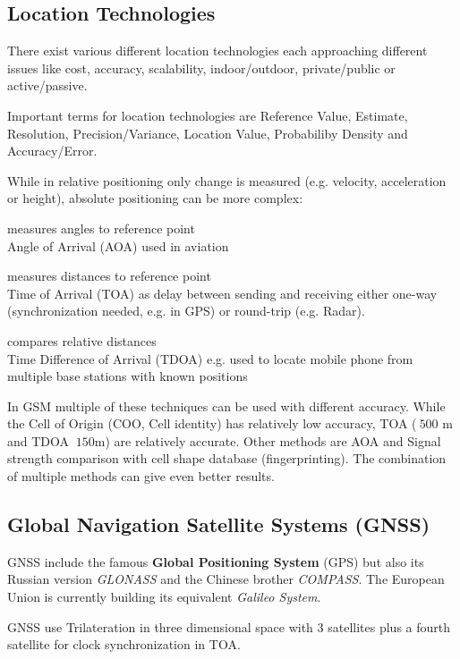 \documentclass{article}
\newlength{\wideitemsep}
\let\olditem\item
\renewcommand{\item}{\setlength{\itemsep}{\wideitemsep}\olditem}
\begin{document}
\begin{multicols}{2}
\subsection{Location Technologies}
There exist various different location technologies each approaching different
issues like cost, accuracy, scalability, indoor/outdoor, private/public or
active/passive.

Important terms for location technologies are Reference Value, Estimate,
Resolution, Precision/Variance, Location Value, Probabiliby Density and
Accuracy/Error.

While in relative positioning only change is measured (e.g. velocity,
acceleration or height), absolute positioning can be more complex:
\begin{description}
\item[Triangulation] measures angles to reference point \ \\
    Angle of Arrival (AOA) used in aviation
\item[Trilateration] measures distances to reference point \ \\
    Time of Arrival (TOA) as delay between sending and receiving either one-way
    (synchronization needed, e.g. in GPS) or round-trip (e.g. Radar).
\item[Multilateration] compares relative distances \ \\
    Time Difference of Arrival (TDOA) e.g. used to locate mobile phone from
    multiple base stations with known positions
\end{description}

In GSM multiple of these techniques can be used with different accuracy. While
the Cell of Origin (COO, Cell identity) has relatively low accuracy, TOA ($~
500$ m and TDOA $~ 150$m) are relatively accurate. Other methods are AOA and
Signal strength comparison with cell shape database (fingerprinting). The
combination of multiple methods can give even better results.

\subsection{Global Navigation Satellite Systems (GNSS)}
GNSS include the famous {\bf Global Positioning System} (GPS) but also its
Russian version {\it GLONASS} and the Chinese brother {\it COMPASS}. The
European Union is currently building its equivalent {\it Galileo System}.

GNSS use Trilateration in three dimensional space with $3$ satellites plus a
fourth satellite for clock synchronization in TOA.


\end{multicols}
\end{document}
